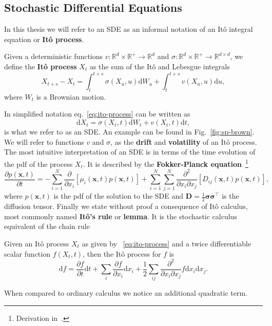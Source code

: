 \subsection{Stochastic Differential Equations}
In this thesis we will refer to an SDE as an informal notation of an It\^ o integral equation or \textbf{It\^ o process}. 
\begin{definition}[It\^ o process]
	Given a deterministic functions $v: \mathbb{R}^{d} \times \mathbb{R}^{+} \rightarrow \mathbb{R}^{d}$ and $\sigma: \mathbb{R}^{d} \times \mathbb{R}^{+} \rightarrow \mathbb{R}^{d \times d}$, we define the \textbf{It\^ o process} $X_t$ as the sum of the It\^ o and Lebesgue integrals
	\begin{equation}
		\label{eq:ito-process}
		X_{t+s}-X_{t}=\int_{t}^{t+s} \sigma\left(X_{u}, u\right) \mathrm{d} W_{u} + \int_{t}^{t+s} v\left(X_{u}, u\right) \mathrm{d} u,
	\end{equation}
	where $W_t$ is a Brownian motion.
\end{definition}
In simplified notation eq.~\eqref{eq:ito-process} can be written as
\begin{equation}
	\label{eq:SDE_general}
	\mathrm{d} X_t = \sigma \left(X_{t}, t\right)\mathrm{d}W_t + v\left(X_{t}, t\right) \mathrm{d}t,
\end{equation}
is what we refer to as an SDE. An example can be found in Fig.~\ref{fig:sp-brown}. We will refer to functions $v$ and $\sigma$, as the \textbf{drift} and \textbf{volatility} of an It\^ o process. The most intuitive interpretation of an SDE is in terms of the time evolution of the pdf of the process $X_t$. It is described by the \textbf{Fokker-Planck equation}~\footnote{Derivation in~\cite{sarkka2019applied}.} 
\begin{equation}
	\label{eq:Fokker-Planck-General}
	\frac{\partial p(\mathbf{x}, t)}{\partial t}=
	-\sum_{i=1}^{N} \frac{\partial}{\partial x_{i}}\left[\mu_{i}(\mathbf{x}, t) p(\mathbf{x}, t)\right]
	+\sum_{i=1}^{N} \sum_{j=1}^{N} \frac{\partial^{2}}{\partial x_{i} \partial x_{j}}\left[D_{i j}(\mathbf{x}, t) p(\mathbf{x}, t)\right],
\end{equation}
where $p(\mathbf{x}, t)$ is the pdf of the solution to the SDE and $\mathbf{D}=\frac{1}{2} \boldsymbol{\sigma} \boldsymbol{\sigma}^{\top}$ is the diffusion tensor. Finally we state without proof a consequence of It\^ o calculus, most commonly named \textbf{It\^ o's rule} or \textbf{lemma}. It is the stochastic calculus equivalent of the chain rule
\begin{lemma}[It\^ o's lemma]
	Given an It\^ o process $X_t$ as given by ~\eqref{eq:ito-process} and a twice differentiable scalar function $f(X_t, t)$, then the It\^ o process for $f$ is
	\begin{equation}
		\label{eq:ito_lemma}
		\mathrm{d} f = \frac{\partial f}{\partial t}\mathrm{d}t + \sum_i \frac{\partial f}{\partial x_i} \mathrm{d}x_i + \frac{1}{2}\sum_{ij} \frac{\partial^{2}}{\partial x_{i} \partial x_{j}} f \mathrm{d}x_i \mathrm{d}x_j.
	\end{equation}
\end{lemma}
\noindent
When compared to ordinary calculus we notice an additional quadratic term.

